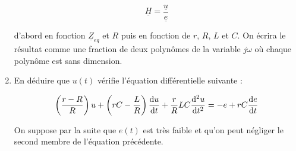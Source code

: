 \documentclass[a4paper,french,bookmarks]{article}
\begin{document}
\begin{enumerate}[resume]
    \begin{equation}
        \underline{H} = \dfrac{\underline{u}}{\underline{e}}
    \end{equation}
    
    d’abord en fonction $\underline{Z}_{eq}$ et $R$ puis en fonction de $r$, $R$, $L$ et $C$. On écrira le résultat comme une fraction de deux polynômes de la variable $j\omega$ où chaque polynôme est sans dimension.
    
    
    \item En déduire que $u(t)$ vérifie l’équation différentielle suivante :
    
    \begin{equation}\label{eq:eq3}
        \left(\dfrac{r-R}{R}\right)u + \left(rC-\dfrac{L}{R}\right)\dfrac{\mathrm d u}{\mathrm d t} + \dfrac{r}{R}LC\dfrac{\mathrm d^2 u}{\mathrm d t^2} = -e + rC\dfrac{\mathrm d e}{\mathrm d t}
    \end{equation}
    
    On suppose par la suite que $e(t)$ est très faible et qu’on peut négliger le second membre de l’équation précédente.
    
    \boxans{
        
}
\end{enumerate}
\end{document}
